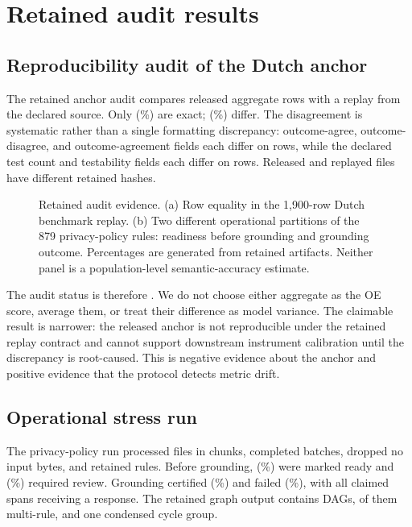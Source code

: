 \section{Retained audit results}

\subsection{Reproducibility audit of the Dutch anchor}

The retained anchor audit compares \ReplayRows{} released aggregate rows with a
replay from the declared source. Only \ReplayExactRows{}
(\ReplayExactPercent{}\%) are exact; \ReplayMismatchRows{}
(\ReplayMismatchPercent{}\%) differ. The disagreement is systematic rather than
a single formatting discrepancy: outcome-agree, outcome-disagree, and
outcome-agreement fields each differ on \ReplayOutcomeAgreementMismatches{}
rows, while the declared test count and testability fields each differ on
\ReplayOutcomeTestsMismatches{} rows. Released and replayed files have different
retained hashes.

\begin{figure}[t]
  \centering
  
  \caption{Retained audit evidence. (a) Row equality in the 1,900-row Dutch
  benchmark replay. (b) Two different operational partitions of the 879
  privacy-policy rules: readiness before grounding and grounding outcome.
  Percentages are generated from retained artifacts. Neither panel is a
  population-level semantic-accuracy estimate.}
  \label{fig:audit-results}
\end{figure}

The audit status is therefore . We do not
choose either aggregate as the OE score, average them, or treat their difference
as model variance. The claimable result is narrower: the released anchor is not
reproducible under the retained replay contract and cannot support downstream
instrument calibration until the discrepancy is root-caused. This is negative
evidence about the anchor and positive evidence that the protocol detects
metric drift.

\subsection{Operational stress run}

The privacy-policy run processed \PrivacyFiles{} files in \PrivacyChunks{}
chunks, completed \PrivacyBatches{} batches, dropped no input bytes, and
retained \PrivacyRules{} rules. Before grounding, \PrivacyReady{}
(\PrivacyReadyPercent{}\%) were marked ready and \PrivacyReview{}
(\PrivacyReviewPercent{}\%) required review. Grounding certified
\PrivacyCertified{} (\PrivacyCertifiedPercent{}\%) and failed \PrivacyFailed{}
(\PrivacyFailedPercent{}\%), with all claimed spans receiving a response. The
retained graph output contains \PrivacyDags{} DAGs, \PrivacyMultiRuleDags{} of
them multi-rule, and one condensed cycle group.

